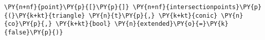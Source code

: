 \begin{Verbatim}[commandchars=\\\{\}]
    \PY{n+nf}{point}\PY{p}{[}\PY{p}{]} \PY{n+nf}{intersectionpoints}\PY{p}{(}\PY{k+kt}{triangle} \PY{n}{t}\PY{p}{,} \PY{k+kt}{conic} \PY{n}{co}\PY{p}{,} \PY{k+kt}{bool} \PY{n}{extended}\PY{o}{=}\PY{k}{false}\PY{p}{)}
\end{Verbatim}
